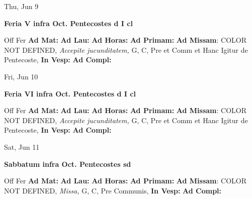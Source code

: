 \documentclass[10pt]{memoir}
\begin{document}
\begin{center}
\begin{minipage}{3.5in}
\vspace{2em}
\begin{center}Thu, Jun 9
\end{center}
\textbf{ \large Feria V infra Oct. Pentecostes
\textnormal{\normalsize d I cl}}

\begin{justify}Off Fer
\textbf{Ad Mat: }
\textbf{Ad Lau: }
\textbf{Ad Horas: }
\textbf{Ad Primam: }\textbf{Ad Missam}: COLOR NOT DEFINED, \textit{Accepite jucunditatem,} G, C, Pre et Comm et Hanc Igitur de Pentecoste, 
\textbf{In Vesp: }
\textbf{Ad Compl: }
\end{justify}
\end{minipage}
\end{center}

\begin{center}
\begin{minipage}{3.5in}
\vspace{2em}
\begin{center}Fri, Jun 10
\end{center}
\textbf{ \large Feria VI infra Oct. Pentecostes
\textnormal{\normalsize d I cl}}

\begin{justify}Off Fer
\textbf{Ad Mat: }
\textbf{Ad Lau: }
\textbf{Ad Horas: }
\textbf{Ad Primam: }\textbf{Ad Missam}: COLOR NOT DEFINED, \textit{Accepite jucunditatem,} G, C, Pre et Comm et Hanc Igitur de Pentecoste, 
\textbf{In Vesp: }
\textbf{Ad Compl: }
\end{justify}
\end{minipage}
\end{center}

\begin{center}
\begin{minipage}{3.5in}
\vspace{2em}
\begin{center}Sat, Jun 11
\end{center}
\textbf{ \large Sabbatum infra Oct. Pentecostes
\textnormal{\normalsize sd}}

\begin{justify}Off Fer
\textbf{Ad Mat: }
\textbf{Ad Lau: }
\textbf{Ad Horas: }
\textbf{Ad Primam: }\textbf{Ad Missam}: COLOR NOT DEFINED, \textit{Missa,} G, C, Pre Communis, 
\textbf{In Vesp: }
\textbf{Ad Compl: }
\end{justify}
\end{minipage}
\end{center}
\end{document}
